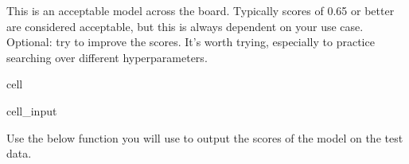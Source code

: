 \documentclass[letterpaper,10pt,english]{sphinxmanual}
\begin{document}
\sphinxAtStartPar
This is an acceptable model across the board. Typically scores of 0.65 or better are considered acceptable, but this is always dependent on your use case. Optional: try to improve the scores. It’s worth trying, especially to practice searching over different hyperparameters.

\begin{sphinxuseclass}{cell}
\begin{sphinxuseclass}{cell_input}
\begin{sphinxVerbatim}[commandchars=\\\{\}]
  
\end{sphinxVerbatim}

\end{sphinxuseclass}
\end{sphinxuseclass}
\sphinxAtStartPar
Use the below  function you will use to output the scores of the model on the test data.
\end{document}
